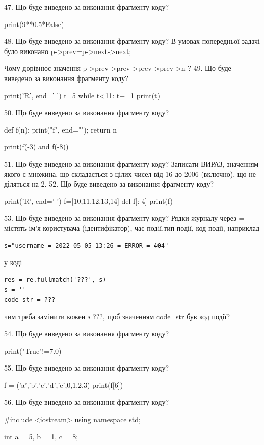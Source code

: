 \documentclass[11pt]{article}
\begin{document}
47. Що буде виведено за виконання фрагменту коду?

print(9**0.5*False)

48. Що буде виведено за виконання фрагменту коду?
В умовах попередньої задачі було виконано p->prev=p->next->next;

Чому дорівнює значення p->prev->prev->prev->prev->n ?
49. Що буде виведено за виконання фрагменту коду?

print('R', end=' ')
t=5
while t<11:
    t+=1
print(t)


50. Що буде виведено за виконання фрагменту коду?

def f(n):
    print("f", end="");
    return n

print(f(-3) and f(-8))

51. Що буде виведено за виконання фрагменту коду?
Записати ВИРАЗ, значенням якого є множина, що складається з цілих чисел від 16 до 2006 (включно), що не діляться на 2.
52. Що буде виведено за виконання фрагменту коду?

print('R', end=' ')
f=[10,11,12,13,14]
del f[:-4]
print(f)


53. Що буде виведено за виконання фрагменту коду?
Рядки журналу через = містять ім'я користувача (ідентифікатор), час події,тип події, код події, наприклад
\begin{verbatim}
s="username = 2022-05-05 13:26 = ERROR = 404"
\end{verbatim}
у коді 
\begin{verbatim}
res = re.fullmatch('???', s) 
s = ''
code_str = ??? 
\end{verbatim}
чим треба замінити кожен з ???, щоб значенням code\_str був код події? 



54. Що буде виведено за виконання фрагменту коду?

print("True"!=7.0)

55. Що буде виведено за виконання фрагменту коду?

f = ('a','b','c','d','e',0,1,2,3)
print(f[6])


56. Що буде виведено за виконання фрагменту коду?

#include <iostream>
using namespace std;

int a = 5, b = 1, c = 8;
\end{document}
